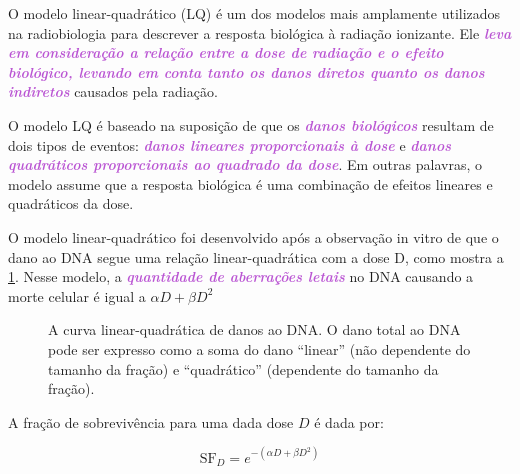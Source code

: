 \documentclass[11pt,a4paper]{article}
\begin{document}
	O modelo linear-quadrático (LQ) é um dos modelos mais amplamente utilizados na radiobiologia para descrever a resposta biológica à radiação ionizante. Ele \textcolor{MediumOrchid}{\textbf{\textit{leva em consideração a relação entre a dose de radiação e o efeito biológico, levando em conta tanto os danos diretos quanto os danos indiretos}}} causados pela radiação.

	O modelo LQ é baseado na suposição de que os \textcolor{MediumOrchid}{\textbf{\textit{danos biológicos}}} resultam de dois tipos de eventos: \textcolor{MediumOrchid}{\textbf{\textit{danos lineares proporcionais à dose}}} e \textcolor{MediumOrchid}{\textbf{\textit{danos quadráticos proporcionais ao quadrado da dose}}}. Em outras palavras, o modelo assume que a resposta biológica é uma combinação de efeitos lineares e quadráticos da dose.

	O modelo linear-quadrático foi desenvolvido após a observação in vitro de que o dano ao DNA segue uma relação linear-quadrática com a dose D, como mostra a \ref{fig:modeloLinearQuadratico2}. Nesse modelo, a \textcolor{MediumOrchid}{\textbf{\textit{quantidade de aberrações letais}}} no DNA causando a morte celular é  igual a $\alpha D + \beta D^2$ 

	\begin{figure}[h]
		\centering
		\caption{A curva linear-quadrática de danos ao DNA. O dano total ao DNA pode ser expresso como a soma do dano “linear” (não dependente do tamanho da fração) e “quadrático” (dependente do tamanho da fração).}
		\label{fig:modeloLinearQuadratico2}
	\end{figure}

	A fração de sobrevivência para uma dada dose $D$ é dada por:

	\begin{equation}
		\text{SF}_{D} = e^{- \left(\alpha D + \beta D^2\right)}
	\end{equation}
\end{document}
